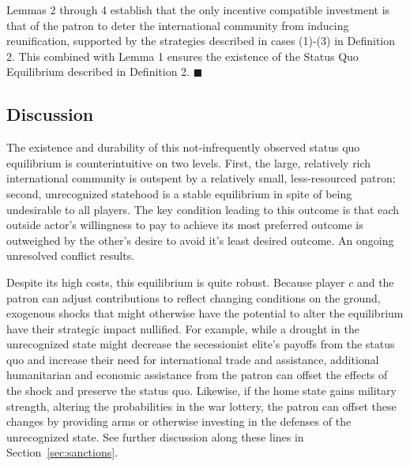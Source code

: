 \documentclass[11pt,letterpaper, notitlepage]{article}
\begin{document}

Lemmas 2 through 4 establish that the only incentive compatible investment is that of the patron to deter the international community from inducing reunification, supported by the strategies described in cases (1)-(3) in Definition 2. This combined with Lemma 1 ensures the existence of the Status Quo Equilibrium described in Definition 2. \hfill $\blacksquare$

\subsection{Discussion}

The existence and durability of this not-infrequently observed status quo equilibrium is counterintuitive on two levels. First, the large, relatively rich international community is outspent by a relatively small, less-resourced patron; second, unrecognized statehood is a stable equilibrium in spite of being undesirable to all players. The key condition leading to this outcome is that each outside actor's willingness to pay to achieve its most preferred outcome is outweighed by the other's desire to avoid it's least desired outcome. An ongoing unresolved conflict results.

Despite its high costs, this equilibrium is quite robust. Because player $c$ and the patron can adjust contributions to reflect changing conditions on the ground, exogenous shocks that might otherwise have the potential to alter the equilibrium have their strategic impact nullified. For example, while a drought in the unrecognized state might decrease the secessionist elite's payoffs from the status quo and increase their need for international trade and assistance, additional humanitarian and economic assistance from the patron can offset the effects of the shock and preserve the status quo. Likewise, if the home state gains military strength, altering the probabilities in the war lottery, the patron can offset these changes by providing arms or otherwise investing in the defenses of the unrecognized state. See further discussion along these lines in Section~\ref{sec:sanctions}.
\end{document}
